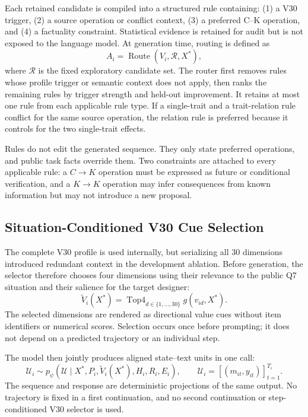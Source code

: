 Each retained candidate is compiled into a structured rule containing: (1) a V30 trigger, (2) a source operation or conflict context, (3) a preferred C--K operation, and (4) a factuality constraint. Statistical evidence is retained for audit but is not exposed to the language model. At generation time, routing is defined as
\begin{equation}
A_i=\operatorname{Route}(V_i,\mathcal R,X^\ast),
\label{eq:app_route}
\end{equation}
where $\mathcal R$ is the fixed exploratory candidate set. The router first removes rules whose profile trigger or semantic context does not apply, then ranks the remaining rules by trigger strength and held-out improvement. It retains at most one rule from each applicable rule type. If a single-trait and a trait-relation rule conflict for the same source operation, the relation rule is preferred because it controls for the two single-trait effects.

Rules do not edit the generated sequence. They only state preferred operations, and public task facts override them. Two constraints are attached to every applicable rule: a $C\rightarrow K$ operation must be expressed as future or conditional verification, and a $K\rightarrow K$ operation may infer consequences from known information but may not introduce a new proposal.

\subsection{Situation-Conditioned V30 Cue Selection}

The complete V30 profile is used internally, but serializing all 30
dimensions introduced redundant context in the development ablation. Before
generation, the selector therefore chooses four dimensions using their
relevance to the public Q7 situation and their salience for the target
designer:
\begin{equation}
\widetilde V_i(X^\ast)
=\operatorname{Top4}_{d\in\{1,\ldots,30\}}g(v_{id},X^\ast).
\label{eq:app_active4_v30}
\end{equation}
The selected dimensions are rendered as directional value cues without item
identifiers or numerical scores. Selection occurs once before prompting; it
does not depend on a predicted trajectory or an individual step.

The model then jointly produces aligned state--text units in one call:
\begin{equation}
\mathcal U_i\sim p_\psi(\mathcal U\mid
X^\ast,P_i,\widetilde V_i(X^\ast),H_i,R_i,E_i),
\qquad
\mathcal U_i=[(m_{it},y_{it})]_{t=1}^{T_i}.
\label{eq:app_one_call_generation}
\end{equation}
The sequence and response are deterministic projections of the same output.
No trajectory is fixed in a first continuation, and no second continuation
or step-conditioned V30 selector is used.
